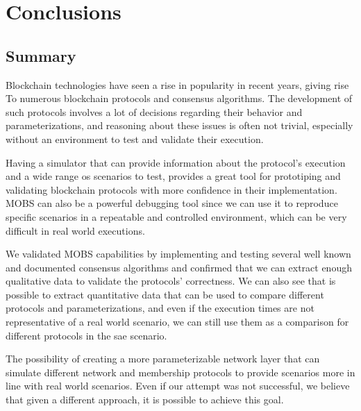
%

\chapter{Conclusions}\label{cha:conclusions}


\section{Summary}\label{sub:summary}

Blockchain technologies have seen a rise in popularity in recent years, giving rise To
numerous blockchain protocols and consensus algorithms. The development of
such protocols involves a lot of decisions regarding their behavior and parameterizations,
and reasoning about these issues is often not trivial, especially without an environment to
test and validate their execution.

Having a simulator that can provide information about the protocol's execution and a wide
range os scenarios to test, provides a great tool for prototiping and validating
blockchain protocols with more confidence in their implementation. MOBS can also
be a powerful debugging tool since we can use it to reproduce specific scenarios in a
repeatable and controlled environment, which can be very difficult in real world executions.

We validated MOBS capabilities by implementing and testing several well known
and documented consensus algorithms and confirmed that we can extract enough
qualitative data to validate the protocols' correctness. We can also see that is possible
to extract quantitative data that can be used to compare different protocols and
parameterizations, and even if the execution times are not representative of a real
world scenario, we can still use them as a comparison for different protocols in
the sae scenario.

The possibility of creating a more parameterizable network layer that can
simulate different network and membership protocols to provide scenarios more in line
with real world scenarios. Even if our attempt was not successful, we believe that
given a different approach, it is possible to achieve this goal.


